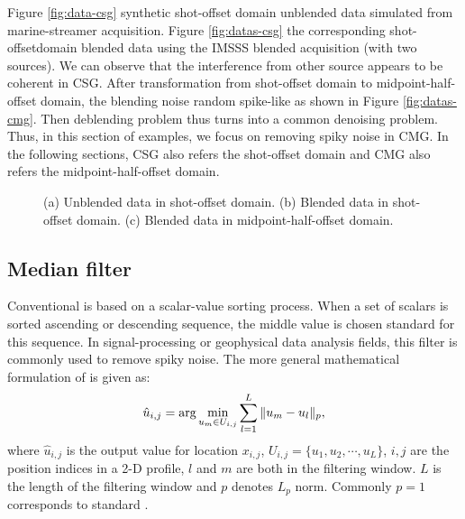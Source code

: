 Figure \ref{fig:data-csg}  synthetic shot-offset domain unblended data simulated from marine-streamer acquisition. Figure \ref{fig:datas-csg}  the corresponding shot-offset\new{-}domain blended data using the IMSSS blended acquisition (with two sources). We can observe that the interference from  other source appears to be coherent in CSG. After transformation from  shot-offset domain to  midpoint-half-offset domain, the blending noise  random  spike-like\new{,} as shown in Figure \ref{fig:datas-cmg}. Then deblending problem thus turns into a common denoising problem. Thus, in this section of examples, we focus on removing spiky noise in CMG. In the following sections, CSG also refers  the shot-offset domain and CMG also refers  the midpoint-half-offset domain. 

\begin{figure}[htb!]
\centering
{}
\caption{(a) Unblended data in  shot-offset domain. (b) Blended data in  shot-offset domain. (c) Blended data in  midpoint-half-offset domain.}
\label{fig:data-csg,datas-csg,datas-cmg}
\end{figure}

\subsection{Median filter}
Conventional  is based on a scalar-value sorting process. When a set of scalars is sorted  ascending or descending sequence, the middle value is chosen  standard for this sequence. In signal-processing or geophysical data analysis fields, this filter is commonly used to remove spiky noise. The more general mathematical formulation of   is given as:
\begin{equation}
\label{eq:mf1}
\hat{u}_{i,j}=\arg\min_{u_m\in U_{i,j}}\sum_{l=1}^{L}\Arrowvert u_m-u_l \Arrowvert_p,
\end{equation}
where $\hat{u}_{i,j}$ is the output value for location $x_{i,j}$, $U_{i,j}=\{u_1,u_2,\cdots,u_L\}$, $i,j$ are the position indices in a 2-D profile,  $l$ and $m$ are both  in the filtering window. $L$ is the length of the filtering window\new{,} and $p$ denotes $L_p$ norm. Commonly $p=1$ corresponds to  standard . 

